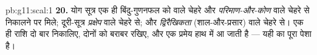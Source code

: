 \begin{solution}{pb:g11:scal:1}
\textbf{20.} योग सूत्र एक ही बिंदु-गुणनफल को \emph{} वाले चेहरे और
\emph{परिमाण-और-कोण} वाले चेहरे से निकालने पर मिले; दूरी-सूत्र \emph{प्रक्षेप}
वाले चेहरे से; और  \emph{द्विरैखिकता} (शाल-और-प्रसार) वाले चेहरे से।
एक ही राशि दो बार निकालिए, दोनों को बराबर रखिए, और एक प्रमेय हाथ में आ जाती
है --- यही  का पूरा पेशा है।
\end{solution}
